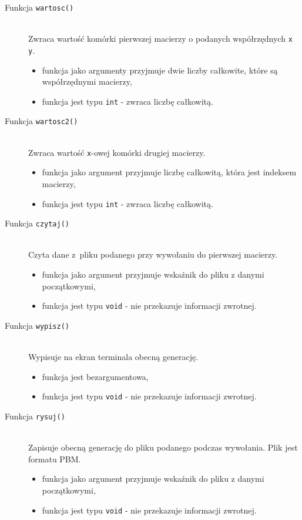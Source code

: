 \documentclass[a4paper,12pt,oneside]{article}
\begin{document}
\begin{description}
\item[Funkcja \texttt{wartosc()}] \hfill \\
Zwraca wartość komórki pierwszej macierzy o podanych współrzędnych \verb+x+ \verb+y+.
\begin{itemize}
\item funkcja jako argumenty przyjmuje dwie liczby całkowite, które są współrzędnymi macierzy,
\item funkcja jest typu \verb+int+ - zwraca liczbę całkowitą.
\end{itemize}

\item[Funkcja \texttt{wartosc2()}] \hfill \\
Zwraca wartość \verb+x+-owej komórki drugiej macierzy.
\begin{itemize}
\item funkcja jako argument przyjmuje liczbę całkowitą, która jest indeksem macierzy,
\item funkcja jest typu \verb+int+ - zwraca liczbę całkowitą.
\end{itemize}

\item[Funkcja \texttt{czytaj()}] \hfill \\
Czyta dane z~pliku podanego przy wywołaniu do pierwszej macierzy.
\begin{itemize}
\item funkcja jako argument przyjmuje wskaźnik do pliku z danymi początkowymi,
\item funkcja jest typu \verb+void+ - nie przekazuje informacji zwrotnej.
\end{itemize}

\item[Funkcja \texttt{wypisz()}] \hfill \\
Wypisuje na ekran terminala obecną generację.
\begin{itemize}
\item funkcja jest bezargumentowa,
\item funkcja jest typu \verb+void+ - nie przekazuje informacji zwrotnej.
\end{itemize}

\item[Funkcja \texttt{rysuj()}] \hfill \\
Zapisuje obecną generację do pliku podanego podczas wywołania. Plik jest formatu PBM.
\begin{itemize}
\item funkcja jako argument przyjmuje wskaźnik do pliku z danymi początkowymi,
\item funkcja jest typu \verb+void+ - nie przekazuje informacji zwrotnej.
\end{itemize}



\end{description}
\end{document}

